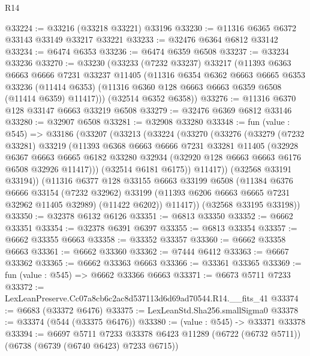 \begin{lexlean}{R14}
\begin{coremodule}
@33224 := @33216 (@33218 @33221) @33196
@33230 := @11316 @6365 @6372 @33143 @33149 @33217 @33221
@33233 := @32476 @6364 @6812 @33142
@33234 := @6474 @6353
@33236 := @6474 @6359 @6508
@33237 := @33234 @33236
@33270 := @33230
    (@33233
      (@7232 @33237)
      @33217
      (@11393
        @6363
        @6663
        @6666
        @7231
        @33237
        @11405
        (@11316
          @6354
          @6362
          @6663
          @6665
          @6353
          @33236
          (@11414 @6353)
          (@11316 @6360 @128 @6663 @6663 @6359 @6508 (@11414 @6359) @11417)))
      (@32514 @6352 @6358))
@33276 := @11316 @6370 @128 @33147 @6663 @33219 @6508
@33279 := @32476 @6369 @6812 @33146
@33280 := @32907 @6508
@33281 := @32908 @33280
@33348 := fun (value : @545) =>
  @33186
    (@33207
      (@33213
        (@33224
          (@33270
            (@33276
              (@33279
                (@7232 @33281)
                @33219
                (@11393
                  @6368
                  @6663
                  @6666
                  @7231
                  @33281
                  @11405
                  (@32928
                    @6367
                    @6663
                    @6665
                    @6182
                    @33280
                    @32934
                    (@32920 @128 @6663 @6663 @6176 @6508 @32926 @11417)))
                (@32514 @6181 @6175))
              @11417))
          (@32568 @33191 @33194))
        (@11316
          @6377
          @128
          @33155
          @6663
          @33199
          @6508
          (@11384
            @6376
            @6666
            @33154
            (@7232 @32962)
            @33199
            (@11393 @6206 @6663 @6665 @7231 @32962 @11405 @32989)
            (@11422 @6202))
          @11417))
      (@32568 @33195 @33198))
@33350 := @32378 @6132 @6126
@33351 := @6813 @33350
@33352 := @6662 @33351
@33354 := @32378 @6391 @6397
@33355 := @6813 @33354
@33357 := @6662 @33355 @6663
@33358 := @33352 @33357
@33360 := @6662 @33358 @6663
@33361 := @6662 @33360
@33362 := @7444 @6412
@33363 := @6667 @33362
@33365 := @6662 @33363 @6663
@33366 := @33361 @33365
@33369 := fun (value : @545) => @6662 @33366 @6663
@33371 := @6673 @5711 @7233
@33372 := LexLeanPreserve.Cc07a8cb6c2ac8d537113d6d69ad70544.R14.__fits_41
@33374 := @6683 (@33372 @6476)
@33375 := LexLeanStd.Sha256.smallSigma0
@33378 := @33374 (@544 (@33375 @6476))
@33380 := (value : @545) -> @33371 @33378
@33394 := @6697
    @5711
    @7233
    @33378
    @6423
    @11289
    (@6722 (@6732 @5711))
    (@6738 (@6739 (@6740 @6423) @7233 @6715))

\end{coremodule}
\end{lexlean}

